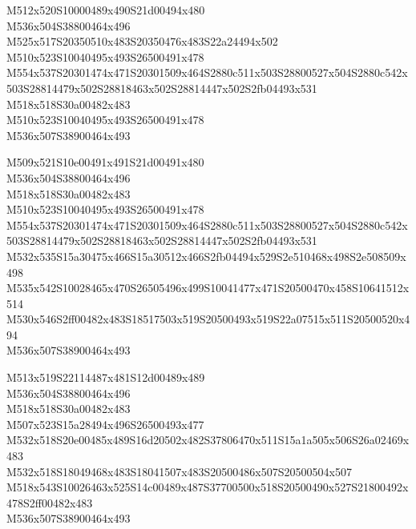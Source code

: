 \documentclass{article}
\begin{document}
\begin{multicols}{5}
\begin{center}

M512x520S10000489x490S21d00494x480 %
\\M536x504S38800464x496 %
\\M525x517S20350510x483S20350476x483S22a24494x502 %
\\M510x523S10040495x493S26500491x478 %
\\M554x537S20301474x471S20301509x464S2880c511x503S28800527x504S2880c542x503S28814479x502S28818463x502S28814447x502S2fb04493x531 %
\\M518x518S30a00482x483 %
\\M510x523S10040495x493S26500491x478 %
\\M536x507S38900464x493 %
\vfil
\columnbreak

M509x521S10e00491x491S21d00491x480 %
\\M536x504S38800464x496 %
\\M518x518S30a00482x483 %
\\M510x523S10040495x493S26500491x478 %
\\M554x537S20301474x471S20301509x464S2880c511x503S28800527x504S2880c542x503S28814479x502S28818463x502S28814447x502S2fb04493x531 %
\\M532x535S15a30475x466S15a30512x466S2fb04494x529S2e510468x498S2e508509x498 %
\\M535x542S10028465x470S26505496x499S10041477x471S20500470x458S10641512x514 %
\\M530x546S2ff00482x483S18517503x519S20500493x519S22a07515x511S20500520x494 %
\\M536x507S38900464x493 %
\vfil
\columnbreak

M513x519S22114487x481S12d00489x489 %
\\M536x504S38800464x496 %
\\M518x518S30a00482x483 %
\\M507x523S15a28494x496S26500493x477 %
\\M532x518S20e00485x489S16d20502x482S37806470x511S15a1a505x506S26a02469x483 %
\\M532x518S18049468x483S18041507x483S20500486x507S20500504x507 %
\\M518x543S10026463x525S14c00489x487S37700500x518S20500490x527S21800492x478S2ff00482x483 %
\\M536x507S38900464x493 %
\vfil
\columnbreak


\end{center}
\end{multicols}
\end{document}
